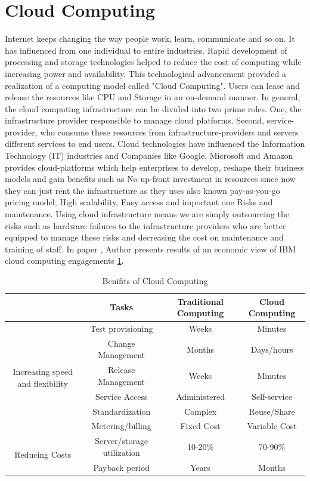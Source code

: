 \section{Cloud Computing}

Internet keeps changing the way people work, learn, communicate and so on. It has influenced from one individual to entire industries. Rapid development of processing and storage technologies helped to reduce the cost of computing while increasing power and availability. This technological advancement provided a realization of a computing model called "Cloud Computing". Users can lease and release the resources like CPU and Storage in an on-demand manner. In general, the cloud computing infrastructure can be divided into two prime roles. One, the infrastructure provider responsible to manage cloud platforms. Second, service-provider, who consume these resources from infrastructure-providers and servers different services to end users. Cloud technologies have influenced the Information Technology (IT) industries and Companies like Google, Microsoft and Amazon provides cloud-platforms which help enterprises to develop, reshape their business models and gain benefits such as No up-front investment in resources since now they can just rent the infrastructure as they uses also known pay-as-you-go pricing model, High scalability, Easy access and important one Risks and maintenance. Using cloud infrastructure means we are simply outsourcing the risks such as hardware failures to the infrastructure providers who are better equipped to manage these risks and decreasing the cost on maintenance and training of staff. In paper \cite{lee2013view}, Author presents results of an economic view of IBM cloud computing engagements \ref{tab:IT_benifits}.


\begin{table}[hb]
    \centering
    \begin{tabular}{|c|c|c|c|}
    \hline
         & Tasks & Traditional Computing &  Cloud Computing \\
    \hline
    \multirow{6}{5em}{Increasing speed and flexibility} & Test provisioning & Weeks & Minutes \\ 
        & Change Management & Months & Days/hours \\ 
        & Release Management & Weeks & Minutes \\
        & Service Access & Administered & Self-service \\ 
        & Standardization & Complex & Reuse/Share \\
        & Metering/billing & Fixed Cost & Variable Cost \\
    \hline
    \multirow{2}{5em}{Reducing Costs} & Server/storage utilization & 10-20\% & 70-90\% \\
        & Payback period & Years & Months \\
    \hline
    \end{tabular}
    \caption{Benifits of Cloud Computing}
    \label{tab:IT_benifits}
\end{table}




